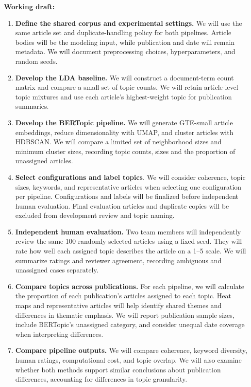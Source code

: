 \documentclass[conference]{IEEEtran}
\begin{document}
\textbf{Working draft:}

\begin{enumerate}
    \item \textbf{Define the shared corpus and experimental settings.} We will use the same article set and duplicate-handling policy for both pipelines. Article bodies will be the modeling input, while publication and date will remain metadata. We will document preprocessing choices, hyperparameters, and random seeds.
    \item \textbf{Develop the LDA baseline.} We will construct a document-term count matrix and compare a small set of topic counts. We will retain article-level topic mixtures and use each article's highest-weight topic for publication summaries. 
    \item \textbf{Develop the BERTopic pipeline.} We will generate GTE-small article embeddings, reduce dimensionality with UMAP, and cluster articles with HDBSCAN. We will compare a limited set of neighborhood sizes and minimum cluster sizes, recording topic counts, sizes and the proportion of unassigned articles.
    \item \textbf{Select configurations and label topics}. We will consider coherence, topic sizes, keywords, and representative articles when selecting one configuration per pipeline. Configurations and labels will be finalized before independent human evaluation. Final evaluation articles and duplicate copies will be excluded from development review and topic naming.
    \item \textbf{Independent human evaluation.} Two team members will independently review the same 100 randomly selected articles using a fixed seed. They will rate how well each assigned topic describes the article on a 1–5 scale. We will summarize ratings and reviewer agreement, recording ambiguous and unassigned cases separately.
    \item \textbf{Compare topics across publications. } For each pipeline, we will calculate the proportion of each publication’s articles assigned to each topic. Heat maps and representative articles will help identify shared themes and differences in thematic emphasis. We will report publication sample sizes, include BERTopic’s unassigned category, and consider unequal date coverage when interpreting differences.
    \item \textbf{Compare pipeline outputs.} We will compare coherence, keyword diversity, human ratings, computational cost, and topic overlap. We will also examine whether both methods support similar conclusions about publication differences, accounting for differences in topic granularity.

\end{enumerate}
\end{document}
